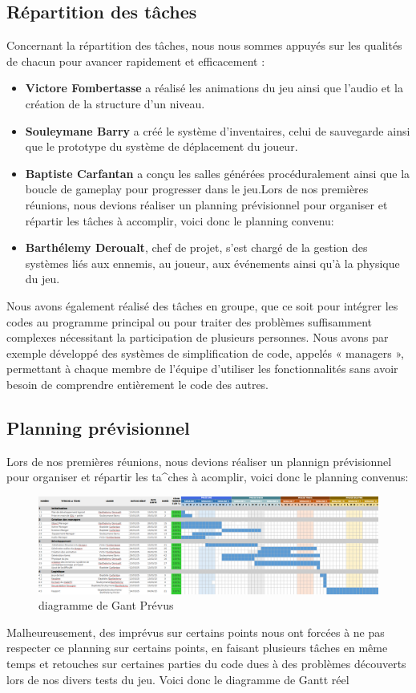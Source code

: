 \documentclass[a4paper,11pt]{article}
\begin{document}
\subsection{Répartition des tâches}


Concernant la répartition des tâches, nous nous sommes appuyés sur les qualités de chacun pour avancer rapidement et efficacement :


\begin{itemize}[leftmargin=*]
  \item \textbf{Victore Fombertasse} a réalisé les animations du jeu ainsi que l'audio et la création de la structure d'un niveau.
  \item \textbf{Souleymane Barry} a créé le système d'inventaires, celui de sauvegarde ainsi que le prototype du système de déplacement du joueur.
  \item \textbf{Baptiste Carfantan} a conçu les salles générées procéduralement ainsi que la boucle de gameplay pour progresser dans le jeu.Lors de nos premières réunions, nous devions réaliser un planning prévisionnel pour organiser et répartir les tâches à accomplir, voici donc le planning convenu:
  \item \textbf{Barthélemy Deroualt}, chef de projet, s'est chargé de la gestion des systèmes liés aux ennemis, au joueur, aux événements ainsi qu'à la physique du jeu.
\end{itemize}

Nous avons également réalisé des tâches en groupe, que ce soit pour intégrer les codes au programme principal ou pour traiter des problèmes suffisamment complexes nécessitant la participation de plusieurs personnes. Nous avons par exemple développé des systèmes de simplification de code, appelés « managers », permettant à chaque membre de l'équipe d'utiliser les fonctionnalités sans avoir besoin de comprendre entièrement le code des autres.

\subsection{Planning prévisionnel}

Lors de nos premières réunions, nous devions réaliser un plannign prévisionnel pour organiser et répartir les ta^ches à acomplir, voici donc le planning convenus:

\begin{figure}[ht]
\centering
\includegraphics[width=0.8\linewidth]{./img/diagrmmePrevus.png}
\caption{diagramme de Gant Prévus}
\label{fig:map_gen32}
\end{figure}
\bigskip
Malheureusement, des imprévus sur certains points nous ont forcées à ne pas respecter ce planning sur certains points, en faisant plusieurs tâches en même temps et retouches sur certaines parties du code dues à des problèmes découverts lors de nos divers tests du jeu. Voici donc le diagramme de Gantt réel
\end{document}
